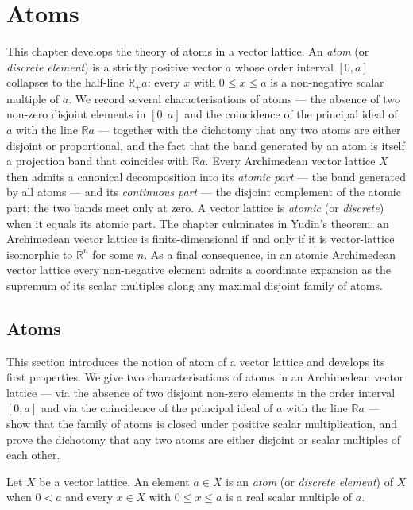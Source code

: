 \chapter{Atoms}

This chapter develops the theory of atoms in a vector lattice. An
\emph{atom} (or \emph{discrete element}) is a strictly positive vector
$a$ whose order interval $[0, a]$ collapses to the half-line
$\mathbb{R}_+ a$: every $x$ with $0 \le x \le a$ is a non-negative
scalar multiple of $a$. We record several characterisations of atoms
— the absence of two non-zero disjoint elements in $[0, a]$ and the
coincidence of the principal ideal of $a$ with the line
$\mathbb{R} a$ — together with the dichotomy that any two atoms are
either disjoint or proportional, and the fact that the band generated
by an atom is itself a projection band that coincides with
$\mathbb{R} a$. Every Archimedean vector lattice $X$ then admits a
canonical decomposition into its \emph{atomic part} — the band
generated by all atoms — and its \emph{continuous part} — the disjoint
complement of the atomic part; the two bands meet only at zero. A
vector lattice is \emph{atomic} (or \emph{discrete}) when it equals
its atomic part. The chapter culminates in Yudin's theorem: an
Archimedean vector lattice is finite-dimensional if and only if it is
vector-lattice isomorphic to $\mathbb{R}^n$ for some $n$. As a final
consequence, in an atomic Archimedean vector lattice every
non-negative element admits a coordinate expansion as the supremum of
its scalar multiples along any maximal disjoint family of atoms.

\section{Atoms}

This section introduces the notion of atom of a vector lattice and
develops its first properties. We give two characterisations of atoms
in an Archimedean vector lattice — via the absence of two disjoint
non-zero elements in the order interval $[0, a]$ and via the
coincidence of the principal ideal of $a$ with the line $\mathbb{R} a$
— show that the family of atoms is closed under positive scalar
multiplication, and prove the dichotomy that any two atoms are either
disjoint or scalar multiples of each other.

\begin{definition}
\label{def:isVLAtom}
\leanok
{}
Let $X$ be a vector lattice. An element $a \in X$ is an \emph{atom}
(or \emph{discrete element}) of $X$ when $0 < a$ and every $x \in X$
with $0 \le x \le a$ is a real scalar multiple of $a$.
\end{definition}

